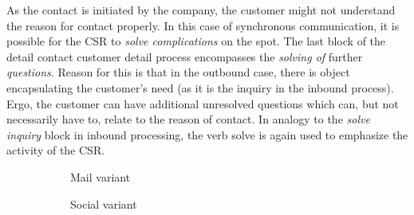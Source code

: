 	 As the contact is initiated by the company, the customer might not understand the reason for contact properly. In this case of synchronous communication, it is possible for the \acrshort{CSR} to\textit{ solve complications} on the spot. The last block of the detail contact customer detail process encompasses the \textit{solving of }further \textit{questions}. Reason for this is that in the outbound case, there is object encapsulating the customer's need (as it is the inquiry in the inbound process). Ergo, the customer can have additional unresolved questions which can, but not necessarily have to, relate to the reason of contact. In analogy to the \textit{solve inquiry} block in inbound processing, the verb solve is again used to emphasize the activity of the  \acrshort{CSR}. 
	 
	 
	 \begin{figure}[caption={Contact customer detail process}, label={fig:outbound:con}]
	 	
	 	\begin{subfigure}[b]{.45\textwidth}
	 		\centering
	 		
	 		\caption{Mail variant}\label{fig:outbound:con:mail}
	 	\end{subfigure}
	 	\begin{subfigure}[b]{.45\textwidth}
	 		\centering	
	 		\caption{Social variant}\label{fig:outbound:con:social}
	 	\end{subfigure}
	 	\begin{subfigure}[b]{.45\textwidth}
	 		\centering	
\end{subfigure}
\end{figure}
